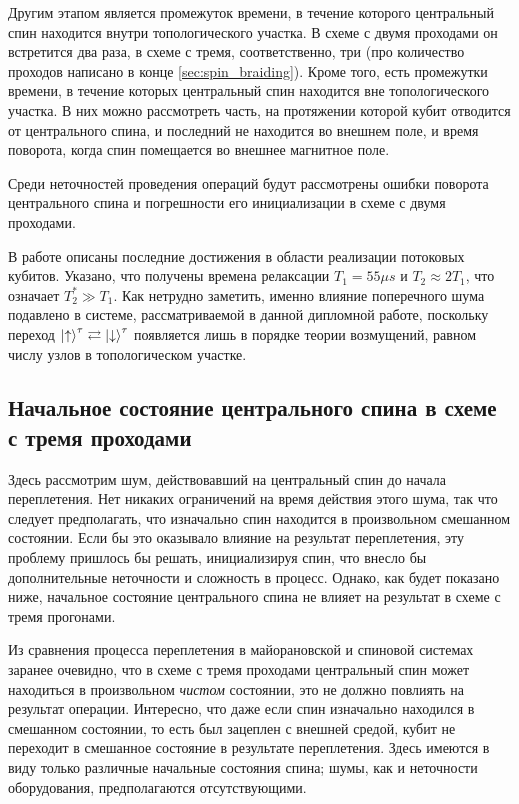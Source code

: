 \documentclass[a4paper,12pt]{article}
\theoremstyle{plain} %
\theoremstyle{definition} %
\theoremstyle{remark} %
\begin{document}
Другим этапом является промежуток времени, в течение которого центральный спин находится внутри топологического участка. 
В схеме с двумя проходами он встретится два раза, в схеме с тремя, соответственно, три (про количество проходов написано в конце \ref{sec:spin_braiding}). 
Кроме того, есть промежутки времени, в течение которых центральный спин находится вне топологического участка. 
В них можно рассмотреть часть, на протяжении которой кубит отводится от центрального спина, и последний не находится во внешнем поле, и время поворота, когда спин помещается во внешнее магнитное поле.

Среди неточностей проведения операций будут рассмотрены ошибки поворота центрального спина и погрешности его инициализации в схеме с двумя проходами.

В работе \cite{flux_qubit} описаны последние достижения в области реализации потоковых кубитов. Указано, что получены времена релаксации $T_1 = 55 \mu s$ и $T_2 \approx 2 T_1$, что означает $T_2^* \gg T_1$. Как нетрудно заметить, именно влияние поперечного шума подавлено в системе, рассматриваемой в данной дипломной работе, поскольку переход $\ket{\uparrow}^\tau \rightleftarrows \ket{\downarrow}^\tau$ появляется лишь в порядке теории возмущений, равном числу узлов в топологическом участке.

\subsection{Начальное состояние центрального спина в схеме с тремя проходами}

Здесь рассмотрим шум, действовавший на центральный спин до начала переплетения. 
Нет никаких ограничений на время действия этого шума, так что следует предполагать, что изначально спин находится в произвольном смешанном состоянии. 
Если бы это оказывало влияние на результат переплетения, эту проблему пришлось бы решать, инициализируя спин, что внесло бы дополнительные неточности и сложность в процесс. 
Однако, как будет показано ниже, начальное состояние центрального спина не влияет на результат в схеме с тремя прогонами.

Из сравнения процесса переплетения в майорановской и спиновой системах заранее очевидно, что в схеме с тремя проходами центральный спин может находиться в произвольном \textit{чистом} состоянии, это не должно повлиять на результат операции.
Интересно, что даже если спин изначально находился в смешанном состоянии, то есть был зацеплен с внешней средой, кубит не переходит в смешанное состояние в результате переплетения. 
Здесь имеются в виду только различные начальные состояния спина; шумы, как и неточности оборудования, предполагаются отсутствующими.
\end{document}
